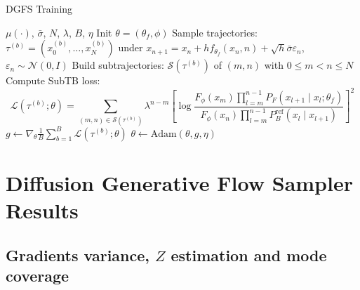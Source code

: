 \documentclass[aspectratio=169,xcolor=dvipsnames]{beamer}
\begin{document}
\begin{frame}[t,fragile]{}
\footnotesize  

\vspace{-0.2cm}

\begin{algorithm}[H]
    \footnotesize
\caption{DGFS Training}
\label{alg:dgfs}
\begin{algorithmic}[1]
\Require $\mu(\cdot)$, $\bar{\sigma}$, $N$, $\lambda$, $B$, $\eta$
\State Init $\theta=(\theta_f,\phi)$
\Repeat
    \State Sample trajectories:
        \State $\tau^{(b)}=(x^{(b)}_0,\ldots,x^{(b)}_N)$ under $x_{n+1}=x_n+h f_{\theta_f}(x_n,n)+\sqrt{h}\bar{\sigma}\varepsilon_n$, $\varepsilon_n\sim\mathcal N(0,I)$
    \EndFor
    \State Build subtrajectories: $\mathcal S(\tau^{(b)})$ of $(m,n)$ with $0\le m<n\le N$
    \State Compute SubTB loss:
    \begin{equation*}
    \mathcal L(\tau^{(b)};\theta)=\sum_{(m,n)\in\mathcal S(\tau^{(b)})}\lambda^{n-m}\left[\log\frac{F_\phi(x_m)\prod_{l=m}^{n-1} P_F(x_{l+1}\mid x_l;\theta_f)}{F_\phi(x_n)\prod_{l=m}^{n-1} P_B^{\mathrm{ref}}(x_l\mid x_{l+1})}\right]^2
    \end{equation*}
    \State $g \leftarrow \nabla_{\theta}\frac{1}{B}\sum_{b=1}^B \mathcal L(\tau^{(b)};\theta)$
    \State $\theta \leftarrow \mathrm{Adam}(\theta, g, \eta)$
\end{algorithmic}
\end{algorithm}
\end{frame}


\section{Diffusion Generative Flow Sampler Results}

\subsection{Gradients variance, $Z$ estimation and mode coverage}
\end{document}
